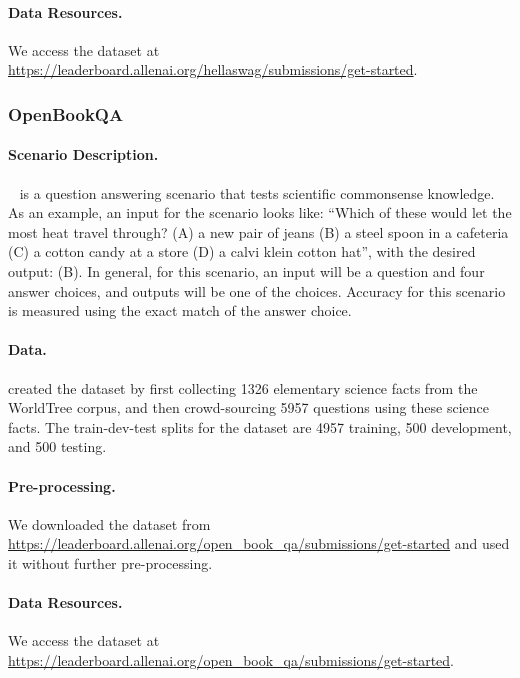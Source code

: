\paragraph{Data Resources.}
We access the dataset at \url{https://leaderboard.allenai.org/hellaswag/submissions/get-started}.

\subsubsection{OpenBookQA}


\paragraph{Scenario Description.}
\openbookqa~\citep{mihaylov2018can} is a question answering scenario that tests scientific commonsense knowledge.
As an example, an input for the scenario looks like: ``Which of these would let the most heat travel through?
(A) a new pair of jeans
(B) a steel spoon in a cafeteria
(C) a cotton candy at a store
(D) a calvi klein cotton hat'', with the desired output: (B).
In general, for this scenario, an input will be a question and four answer choices, and outputs will be one of the choices.
Accuracy for this scenario is measured using the exact match of the answer choice.

\paragraph{Data.}
\citet{mihaylov2018can} created the dataset by first collecting 1326 elementary science facts from the WorldTree corpus, and then crowd-sourcing 5957 questions using these science facts.
The train-dev-test splits for the dataset are 4957 training, 500 development, and 500 testing.



\paragraph{Pre-processing.}
We downloaded the dataset from \url{https://leaderboard.allenai.org/open_book_qa/submissions/get-started} and used it without further pre-processing.

\paragraph{Data Resources.}
We access the dataset at \url{https://leaderboard.allenai.org/open_book_qa/submissions/get-started}.


